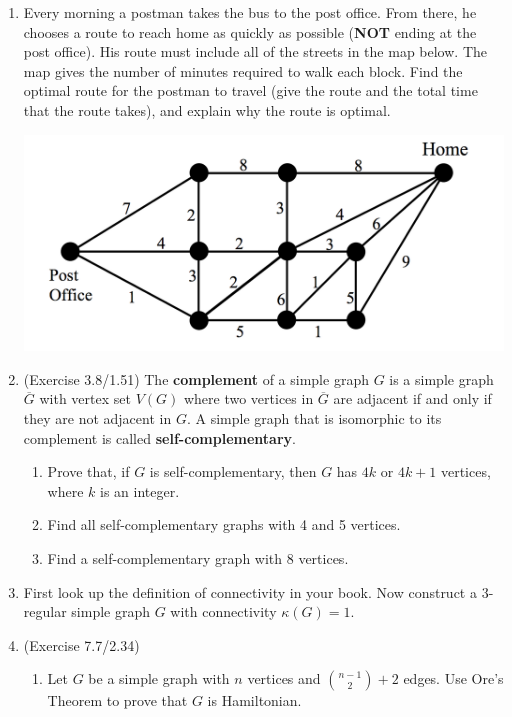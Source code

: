 \documentclass{article}
\begin{document}
\begin{enumerate}

\item Every morning a postman takes the bus to the post office. From there, he chooses a route to reach home as quickly as possible ({\bf NOT} ending at the post office). His route must include all of the streets in the map below. The map gives the number of minutes required to walk each block. Find the optimal route for the postman to travel (give the route and the total time that the route takes), and explain why the route is optimal.
\begin{center}
	\includegraphics[width=.6\textwidth]{post-home2.png}
\end{center}

\item (Exercise 3.8/1.51) The {\bf complement} of a simple graph $G$ is a simple graph $\overline G$ with vertex set $V(G)$ where two vertices in $\overline G$ are adjacent if and only if they are not adjacent in $G$. A simple graph that is isomorphic to its complement is called {\bf self-complementary}.
\begin{enumerate}
	\item Prove that, if $G$ is self-complementary, then $G$ has $4k$ or $4k+1$ vertices, where $k$ is an integer.

	\item Find all self-complementary graphs with 4 and 5 vertices.

	\item Find a self-complementary graph with 8 vertices.
\end{enumerate}

\item First look up the definition of connectivity in your book. Now construct a 3-regular simple graph $G$ with connectivity $\kappa(G)=1$.

\item (Exercise 7.7/2.34)
\begin{enumerate}
	\item Let $G$ be a simple graph with $n$ vertices and $\displaystyle\binom{n-1} 2 +2$ edges. Use Ore's Theorem to prove that $G$ is Hamiltonian. 


\end{enumerate}
\end{enumerate}
\end{document}
